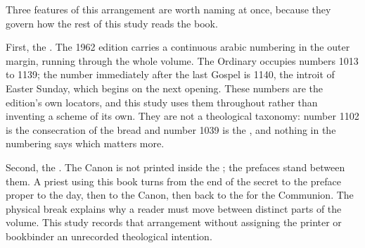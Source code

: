 \begin{unittable}
\end{unittable}

Three features of this arrangement are worth naming at once, because they
govern how the rest of this study reads the book.

First, the . The 1962 edition carries a continuous
arabic numbering in the outer margin, running through the whole volume. The
Ordinary occupies numbers 1013 to 1139; the number immediately after the last
Gospel is 1140, the introit of Easter Sunday, which begins on the next opening.
These numbers are the edition's own locators, and this study uses them
throughout rather than inventing a scheme of its own. They are not a
theological taxonomy: number 1102 is the consecration of the bread and number
1039 is the , and nothing in the numbering says which matters
more.

Second, the . The Canon is not printed inside the
; the prefaces stand between them. A priest using this book
turns from the end of the secret to the preface proper to the day, then to the
Canon, then back to the  for the Communion. The physical
break explains why a reader must move between distinct parts of the volume.
This study records that arrangement without assigning the printer or
bookbinder an unrecorded theological intention.


